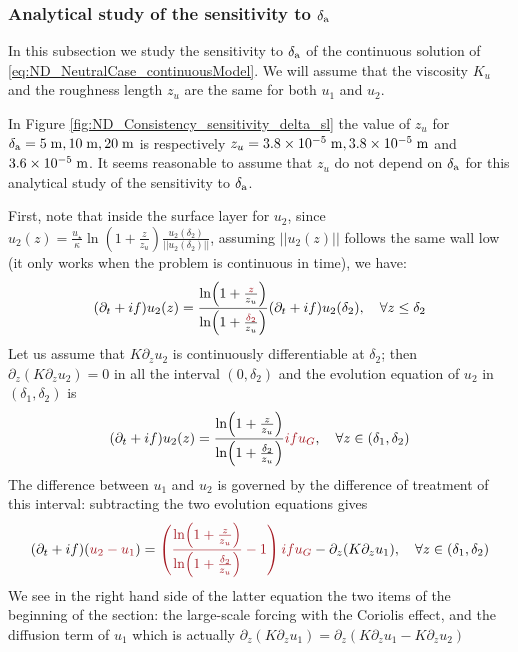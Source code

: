\subsubsection{Analytical study of the sensitivity to $\delta_{\rm a}$}
\label{sec:ND_Consistency_sensitivity_delta_sl}
In this subsection we study the sensitivity to $\delta_{\rm a}$
of the continuous solution of
\eqref{eq:ND_NeutralCase_continuousModel}.
We will assume that the viscosity $K_u$ and the roughness length
$z_u$ are the same for both $u_1$ and $u_2$.
\par
In Figure \ref{fig:ND_Consistency_sensitivity_delta_sl} the value
of $z_u$ for $\delta_{\rm a} = 5\;{\rm m},10\;{\rm m},20\;{\rm m}$
is respectively $z_u = 3.8 \times 10^{-5} \;{\rm m},
3.8 \times 10^{-5} \;{\rm m}$ and $3.6 \times 10^{-5} \;{\rm m}$.
It seems reasonable to assume that $z_u$ do not depend on
$\delta_{\rm a}$ for this analytical study of the sensitivity to
$\delta_{\rm a}$.
\par
First, note that inside the surface layer for $u_2$,
since $u_2(z) = \frac{u_\star}{\kappa}\ln(1+\frac{z}{z_u})
\frac{u_2(\delta_{2})}{||u_2(\delta_{2})||}$, assuming
$||u_2(z)||$ follows the same wall low (it only works
when the problem is continuous in time), we have:
\begin{equation}
	(\partial_t + if) u_2(z) = \frac{\ln(1+\frac{\emphase{z}}{z_u})}
	{\ln(1+\frac{\emphase{\delta_2}}{z_u})}(\partial_t + if) u_2(\delta_2), 
~~~\forall z \leq \delta_2
\end{equation}
Let us assume that $K\partial_z u_2$ is
continuously differentiable at $\delta_2$;
then $\partial_z (K\partial_z u_2) = 0$ in all the interval
$(0, \delta_2)$ and the evolution equation of $u_2$ in
$(\delta_1, \delta_2)$ is
\begin{equation}
(\partial_t + if) u_2(z) = \frac{\ln(1+\frac{z}{z_u})}
	{\ln(1+\frac{\delta_2}{z_u})} \emphase{i f u_G}, 
	~~~\forall z \in (\delta_1, \delta_2)
\end{equation}
The difference between $u_1$ and $u_2$ is governed by
the difference of treatment of this interval:
subtracting the two evolution equations gives
\begin{equation}
	(\partial_t + if) (\emphase{u_2 - u_1}) =
	\emphase{\left(\frac{\ln(1+\frac{z}{z_u})}
	{\ln(1+\frac{\delta_2}{z_u})} - 1\right)i f u_G} 
-
\partial_z (K \partial_z u_1), ~~~\forall z \in (\delta_1, \delta_2)
\end{equation}
We see in the right hand side of the latter equation the two items
of the beginning of the section:
the large-scale forcing with the Coriolis effect,
and the diffusion term of $u_1$ which is actually
$\partial_z (K \partial_z u_1) = \partial_z (K \partial_z u_1 - K \partial_z u_2)$


